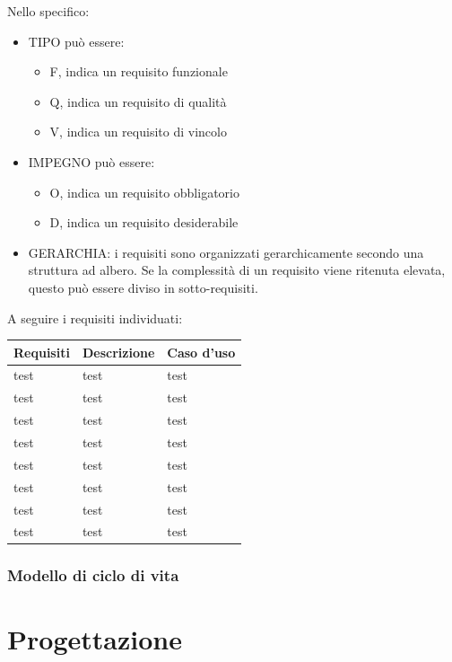 Nello specifico:
\begin{itemize}
\item TIPO può essere:
	\begin{itemize}
		\item F, indica un requisito funzionale
		\item Q, indica un requisito di qualità
		\item V, indica un requisito di vincolo
	\end{itemize} 
\item IMPEGNO può essere:
	\begin{itemize}
		\item O, indica un requisito obbligatorio
		\item D, indica un requisito desiderabile
	\end{itemize} 
\item GERARCHIA: i requisiti sono organizzati gerarchicamente secondo una struttura ad albero. Se la complessità di un requisito viene ritenuta elevata, questo può essere diviso in sotto-requisiti.
\end{itemize}

A seguire i requisiti individuati:

\begin{center}
    \begin{tabular}{ | p{3cm} | l | p{3cm} |}
    \hline
    Requisiti & Descrizione & Caso d'uso \\ \hline
    test & test & test  \\ \hline 
    test & test & test \\ \hline
    test & test & test  \\ \hline 
    test & test & test \\ \hline
    test & test & test  \\ \hline 
    test & test & test \\ \hline
    test & test & test  \\ \hline 
    test & test & test \\ \hline
    \end{tabular}
\end{center}

\subsubsection{Modello di ciclo di vita}

\section{Progettazione}


